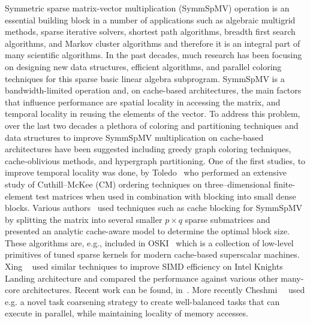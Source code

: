 Symmetric sparse matrix-vector multiplication (\acrshort{SymmSpMV})
operation  is an essential building block in a number of applications
such as algebraic multigrid methods, sparse iterative solvers,
shortest path algorithms, breadth first search algorithms, and Markov
cluster algorithms and therefore it is an integral part of many scientific algorithms.
In the past decades, much research has been
focusing on designing new data structures, efficient algorithms, and
parallel coloring techniques for this sparse basic linear algebra
subprogram.  \acrshort{SymmSpMV} is a bandwidth-limited operation and, on
cache-based architectures, the main factors that influence performance
are spatial locality in accessing the matrix, and temporal locality in
reusing the elements of the vector. To address this problem, over the
last two decades a plethora of coloring and partitioning techniques
and data structures to improve \acrshort{SymmSpMV} multiplication on cache-based
architectures have been suggested including greedy graph coloring
techniques, cache-oblivious methods, and hypergraph partitioning. One
of the first studies, \eg to improve temporal locality was done, \eg
by Toledo~\cite{Toledo:1997:IMP:279511.279532} who performed an
extensive study of Cuthill--McKee (CM) ordering
techniques on three--dimensional finite-element test matrices when
used in combination with blocking into small dense blocks. Various
authors~\cite{Buluc:2011:RMA:2058524.2059503,Williams:2009:OSM:1513001.1513318,doi:10.1177/1094342004041296}
used techniques such as cache blocking for  \acrshort{SymmSpMV} by splitting the matrix into several smaller $p \times
q$ sparse submatrices and presented an analytic cache-aware model to
determine the optimal block size. These algorithms are, e.g.,
included in OSKI~\cite{1742-6596-16-1-071} which is a collection of
low-level primitives of tuned sparse kernels for modern cache-based
superscalar machines. Xing \etal~\cite{Liu:2013:ESM:2464996.2465013}
used similar techniques to improve SIMD efficiency on Intel Knights
Landing architecture and compared the performance against various other
many-core architectures. Recent work
can be found, \eg
in~\cite{Buluc:2011:RMA:2058524.2059503, li2017hbm, Liu:2015:CES:2751205.2751209,  liu2015spmv}.
More recently Cheshmi~\etal~\cite{Cheshmi:2018:PIT:3291656.3291739} used e.g. a
novel task coarsening strategy to create well-balanced tasks that can
execute in parallel, while maintaining locality of memory accesses. 



